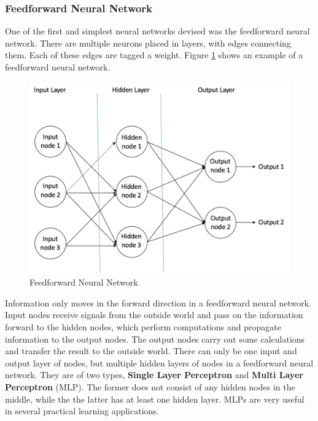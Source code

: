 \subsubsection{Feedforward Neural Network}
\label{sect5_1_1_1}
One of the first and simplest neural networks devised was the feedforward neural network. There are multiple neurons placed in layers, with edges connecting them. Each of these edges are tagged a weight. Figure \ref{fig:cnn4} shows an example of a feedforward neural network.\newline\newline
\begin{figure}[h!]
\includegraphics[width=14cm]{figures/Feedforward_Neural_Network.png}
\caption{Feedforward Neural Network \cite{nn_karn}}
\label{fig:cnn4}
\end{figure}
Information only moves in the forward direction in a feedforward neural network. Input nodes receive signals from the outside world and pass on the information forward to the hidden nodes, which perform computations and propagate information to the output nodes. The output nodes carry out some calculations and transfer the result to the outside world. There can only be one input and output layer of nodes, but multiple hidden layers of nodes in a feedforward neural network.\newline\newline 
They are of two types, \textbf{Single Layer Perceptron} and \textbf{Multi Layer Perceptron} (MLP). The former does not consist of any hidden nodes in the middle, while the the latter has at least one hidden layer. MLPs are very useful in several practical learning applications.
